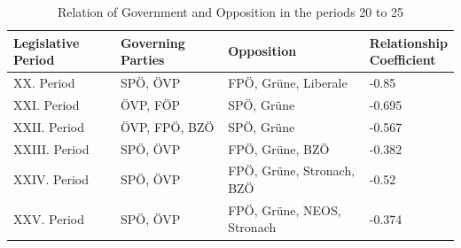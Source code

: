 \begin{table}[h]

\bgroup
\def\arraystretch{1.2}
\begin{tabular}{| l | l | p{4cm} | l |}
\hline
  Legislative Period & Governing Parties & Opposition & \linebreakcell{Relationship\\Coefficient}  \\
\hline
\hline
  XX. Period & SPÖ, ÖVP & FPÖ, Grüne, Liberale & -0.85 \\
\hline
  XXI. Period & ÖVP, FÖP & SPÖ, Grüne & -0.695 \\
\hline
  XXII. Period & ÖVP, FPÖ, BZÖ & SPÖ, Grüne & -0.567 \\
\hline
  XXIII. Period & SPÖ, ÖVP & FPÖ, Grüne, BZÖ & -0.382 \\
\hline
  XXIV. Period & SPÖ, ÖVP & FPÖ, Grüne, Stronach, BZÖ & -0.52 \\
\hline
  XXV. Period & SPÖ, ÖVP & FPÖ, Grüne, NEOS, Stronach & -0.374 \\
\hline

\end{tabular}
\egroup
\caption{Relation of Government and Opposition in the periods 20 to 25}
\label{table:gov_opp_relation}
\end{table}